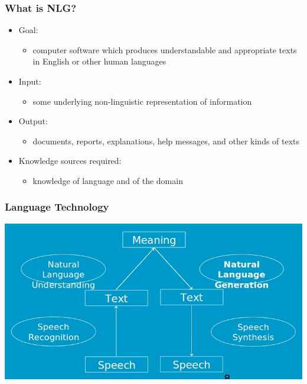 \documentclass[compress,color=usenames]{beamer}
\begin{document}
\begin{frame}
\frametitle{What is NLG?}

\label{f12}
\begin{itemize}
\item { {Goal: }}
\begin{itemize}
\item computer software which produces understandable and appropriate texts in English or other human languages
\end{itemize}
\item { {Input: }}
\begin{itemize}
\item some underlying non-linguistic representation of information
\end{itemize}
\item { {Output: }}
\begin{itemize}
\item documents, reports, explanations, help messages, and other kinds of texts
\end{itemize}
\item { {Knowledge sources required: }}
\begin{itemize}
\item knowledge of language and of the domain
\end{itemize}
\end{itemize}

\end{frame}

\begin{frame}
\frametitle{Language Technology}

\begin{center}
\includegraphics[scale=.3]{pics/pic1.jpg}
\end{center}
\end{frame}
\end{document}
